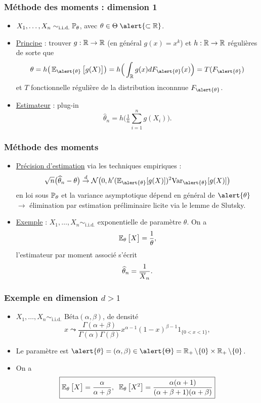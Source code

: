 \begin{frame}
\frametitle{Méthode des moments : dimension 1}
\begin{itemize}
\item $X_1,\ldots, X_n \sim_{\text{i.i.d.}} \operatorname{{\mathbb P}}_\theta$, avec $\theta \in \Theta \;\alert{ \subset \R}$.
\item \underline{Principe} : trouver $g:\operatorname{{\mathbb R}}\rightarrow \operatorname{{\mathbb R}}$ (en général $g(x)=x^k$) et $h:\operatorname{{\mathbb R}}\rightarrow \operatorname{{\mathbb R}}$ \alert{ régulières} de sorte que
$$\theta  = h\big(\E_{\alert{\theta}}\big[g(X)\big]\big) = h\Big(\int_{\R}g(x)dF_{\alert{\theta}}(x)\Big)=T(F_{\alert{\theta}})$$
et $T$ fonctionnelle régulière de la distribution inconnnue $F_{\alert{\theta}}$.
\item \underline{Estimateur} : \og plug-in \fg{}
$$\widehat \theta_n = h\big(\tfrac{1}{n}\sum_{i = 1}^n g(X_i)\big).$$
\end{itemize}
\end{frame}

\begin{frame}
\frametitle{Méthode des moments}
\begin{itemize}
\item \underline{Précision d'estimation} via les techniques empiriques :
$$\sqrt{n}\big(\widehat \theta_n - \theta\big) \stackrel{d}{\rightarrow} {\mathcal N}\big(0, h'(\E_{\alert{\theta}}[g(X)])^2\mathrm{Var}_{\alert{ \theta}}[g(X)]\big)$$
en \alert{ loi sous $\operatorname{{\mathbb P}}_\theta$} et la variance asymptotique dépend en général de $\alert{\theta}$ $\rightarrow$ élimination par estimation préliminaire licite via le lemme de Slutsky.
\item \underline{Exemple} : $X_1,\ldots, X_n\sim_{\text{i.i.d.}}$ exponentielle de paramètre $\theta$. On a
$$\operatorname{{\mathbb E}}_\theta\big[X\big] = \frac{1}{\theta},$$
l'estimateur par moment associé s'écrit
$$\operatorname{\widehat \theta_{\mathnormal{n}}} = \frac{1}{\overline{X}_n}.$$
\end{itemize}
\end{frame}

\begin{frame}
\frametitle{Exemple en dimension $d>1$}
\begin{itemize}
\item $X_1,\ldots,X_n \sim_{\text{i.i.d.}}$ Béta$(\alpha,\beta)$, de densité
$$x \leadsto \frac{\Gamma(\alpha+\beta)}{\Gamma(\alpha)\Gamma(\beta)}x^{\alpha-1}(1-x)^{\beta-1}1_{\{0 < x < 1\}},$$
\item Le paramètre est $\alert{\theta} = (\alpha,\beta) \in \alert{\Theta}=\R_+\setminus\{0\} \times \R_+\setminus\{0\}$.
\item On a
$$\boxed{\operatorname{{\mathbb E}}_\theta\big[X\big]=\frac{\alpha}{\alpha+\beta},\;\;\operatorname{{\mathbb E}}_\theta\big[X^2\big]=\frac{\alpha(\alpha+1)}{(\alpha+\beta+1)(\alpha+\beta)}}$$
\end{itemize}
\end{frame}

